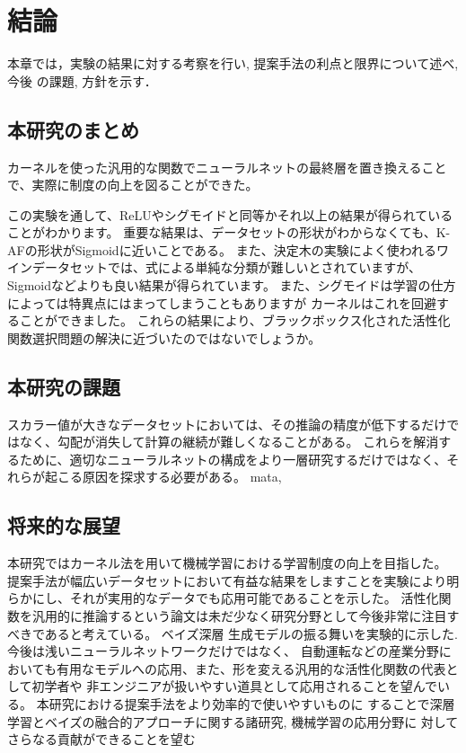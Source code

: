 \chapter{結論}
\label{conclusion}

本章では，実験の結果に対する考察を行い, 提案手法の利点と限界について述べ, 今後
の課題, 方針を示す．


\section{本研究のまとめ}

カーネルを使った汎用的な関数でニューラルネットの最終層を置き換えることで、実際に制度の向上を図ることができた。

 この実験を通して、ReLUやシグモイドと同等かそれ以上の結果が得られていることがわかります。
 重要な結果は、データセットの形状がわからなくても、K-AFの形状がSigmoidに近いことである。 
 また、決定木の実験によく使われるワインデータセットでは、式による単純な分類が難しいとされていますが、Sigmoidなどよりも良い結果が得られています。
 また、シグモイドは学習の仕方によっては特異点にはまってしまうこともありますが カーネルはこれを回避することができました。
 これらの結果により、ブラックボックス化された活性化関数選択問題の解決に近づいたのではないでしょうか。

\section{本研究の課題}
スカラー値が大きなデータセットにおいては、その推論の精度が低下するだけではなく、勾配が消失して計算の継続が難しくなることがある。
これらを解消するために、適切なニューラルネットの構成をより一層研究するだけではなく、それらが起こる原因を探求する必要がある。
mata,



\section{将来的な展望}


本研究ではカーネル法を用いて機械学習における学習制度の向上を目指した。
提案手法が幅広いデータセットにおいて有益な結果をしますことを実験により明らかにし、それが実用的なデータでも応用可能であることを示した。
活性化関数を汎用的に推論するという論文は未だ少なく研究分野として今後非常に注目すべきであると考えている。 ベイズ深層
生成モデルの振る舞いを実験的に示した. 今後は浅いニューラルネットワークだけではなく、
自動運転などの産業分野においても有用なモデルへの応用、また、形を変える汎用的な活性化関数の代表として初学者や
非エンジニアが扱いやすい道具として応用されることを望んでいる。
本研究における提案手法をより効率的で使いやすいものに
することで深層学習とベイズの融合的アプローチに関する諸研究, 機械学習の応用分野に
対してさらなる貢献ができることを望む

